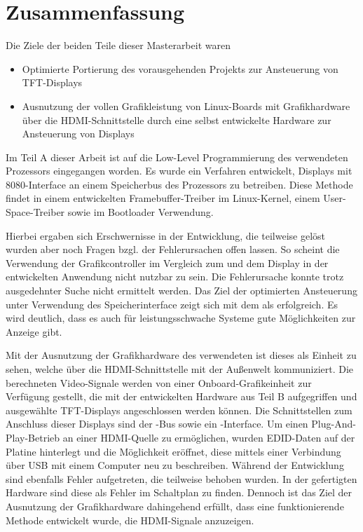 \chapter{Zusammenfassung}
\label{cha:Zusammenfassung}
Die Ziele der beiden Teile dieser Masterarbeit waren
\begin{itemize}
\item Optimierte Portierung des vorausgehenden Projekts zur Ansteuerung von TFT-Displays
\item Ausnutzung der vollen Grafikleistung von Linux-Boards mit Grafikhardware über die HDMI-Schnittstelle durch eine selbst entwickelte Hardware zur Ansteuerung von Displays
\end{itemize}
Im Teil A dieser Arbeit ist auf die Low-Level Programmierung des verwendeten Prozessors  eingegangen worden. Es wurde ein Verfahren entwickelt, Displays mit 8080-Interface an einem Speicherbus des Prozessors zu betreiben. Diese Methode findet in einem entwickelten Framebuffer-Treiber im Linux-Kernel, einem User-Space-Treiber sowie im Bootloader Verwendung.\newline

Hierbei ergaben sich Erschwernisse in der Entwicklung, die teilweise gelöst wurden aber noch Fragen bzgl. der Fehlerursachen offen lassen. 
So scheint die Verwendung der Grafikcontroller  im Vergleich zum  und dem Display  in der entwickelten Anwendung nicht nutzbar zu sein. Die Fehlerursache konnte trotz ausgedehnter Suche nicht ermittelt werden.\newline
Das Ziel der optimierten Ansteuerung unter Verwendung des Speicherinterface zeigt sich mit dem  als erfolgreich. Es wird deutlich, dass es auch für leistungsschwache Systeme gute Möglichkeiten zur Anzeige gibt.\newline

Mit der Ausnutzung der Grafikhardware des verwendeten  ist dieses als Einheit zu sehen, welche über die HDMI-Schnittstelle mit der Außenwelt kommuniziert. Die berechneten Video-Signale werden von einer Onboard-Grafikeinheit zur Verfügung gestellt, die mit der entwickelten Hardware aus Teil B aufgegriffen und ausgewählte TFT-Displays angeschlossen werden können. Die Schnittstellen zum Anschluss dieser Displays sind der -Bus sowie ein -Interface.\newline
Um einen Plug-And-Play-Betrieb an einer HDMI-Quelle zu ermöglichen, wurden EDID-Daten auf der Platine hinterlegt und die Möglichkeit eröffnet, diese mittels einer Verbindung über USB mit einem Computer neu zu beschreiben.\newline
Während der Entwicklung sind ebenfalls Fehler aufgetreten, die teilweise behoben wurden. In der gefertigten Hardware sind diese als Fehler im Schaltplan zu finden.\newline
Dennoch ist das Ziel der Ausnutzung der Grafikhardware dahingehend erfüllt, dass eine funktionierende Methode entwickelt wurde, die HDMI-Signale anzuzeigen.